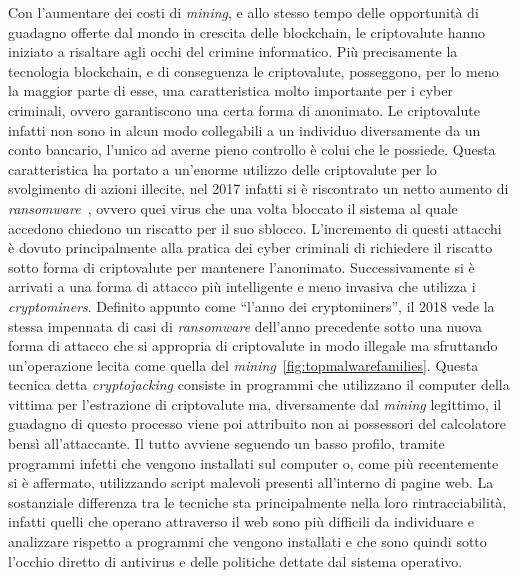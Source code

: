 \documentclass[
11pt, %
oneside, %
italian, %
onehalfspacing,%
headsepline, %
]{MastersDoctoralThesis} %
\begin{document}
Con l'aumentare dei costi di \emph{mining}, e allo stesso tempo delle opportunità di guadagno offerte dal mondo in crescita delle blockchain, le criptovalute hanno iniziato a risaltare agli occhi del crimine informatico. Più precisamente la tecnologia blockchain, e di conseguenza le criptovalute, posseggono, per lo meno la maggior parte di esse, una caratteristica molto importante per i cyber criminali, ovvero garantiscono una certa forma di anonimato. Le criptovalute infatti non sono in alcun modo collegabili a un individuo diversamente da un conto bancario, l'unico ad averne pieno controllo è colui che le possiede. Questa caratteristica ha portato a un'enorme utilizzo delle criptovalute per lo svolgimento di azioni illecite, nel 2017 infatti si è riscontrato un netto aumento di \emph{ransomware}~\citep{skyboxtrends}, ovvero quei virus che una volta bloccato il sistema al quale accedono chiedono un riscatto per il suo sblocco. L'incremento di questi attacchi è dovuto principalmente alla pratica dei cyber criminali di richiedere il riscatto sotto forma di criptovalute per mantenere l'anonimato. Successivamente si è arrivati a una forma di attacco più intelligente e meno invasiva che utilizza i \emph{cryptominers}. Definito appunto come ``l'anno dei cryptominers'', il 2018 vede la stessa impennata di casi di \emph{ransomware} dell'anno precedente sotto una nuova forma di attacco che si appropria di criptovalute in modo illegale ma sfruttando un'operazione lecita come quella del \emph{mining}~\ref{fig:topmalwarefamilies}. Questa tecnica detta \emph{cryptojacking} consiste in programmi che utilizzano il computer della vittima per l'estrazione di criptovalute ma, diversamente dal \emph{mining} legittimo, il guadagno di questo processo viene poi attribuito non ai possessori del calcolatore bensì all'attaccante. Il tutto avviene seguendo un basso profilo, tramite programmi infetti che vengono installati sul computer o, come più recentemente si è affermato, utilizzando script malevoli presenti all'interno di pagine web. La sostanziale differenza tra le tecniche sta principalmente nella loro rintracciabilità, infatti quelli che operano attraverso il web sono più difficili da individuare e analizzare rispetto a programmi che vengono installati e che sono quindi sotto l'occhio diretto di antivirus e delle politiche dettate dal sistema operativo.\\
\end{document}
